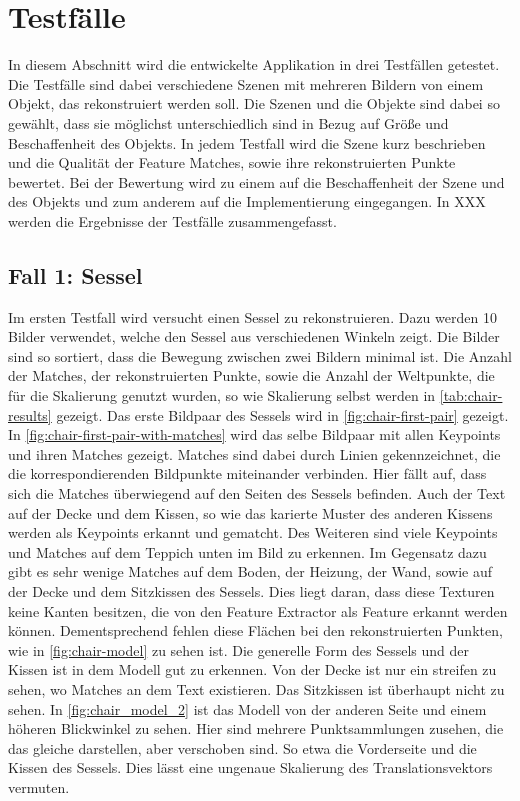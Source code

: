 
\chapter{Testfälle}

In diesem Abschnitt wird die entwickelte Applikation in drei Testfällen getestet.
Die Testfälle sind dabei verschiedene Szenen mit mehreren Bildern von einem Objekt, das rekonstruiert werden soll.
Die Szenen und die Objekte sind dabei so gewählt, dass sie möglichst unterschiedlich sind in Bezug auf Größe und Beschaffenheit des Objekts.
In jedem Testfall wird die Szene kurz beschrieben und die Qualität der Feature Matches, sowie ihre rekonstruierten Punkte bewertet.
Bei der Bewertung wird zu einem auf die Beschaffenheit der Szene und des Objekts und zum anderem auf die Implementierung eingegangen.
In XXX werden die Ergebnisse der Testfälle zusammengefasst.

\section{Fall 1: Sessel}
Im ersten Testfall wird versucht einen Sessel zu rekonstruieren.
Dazu werden 10 Bilder verwendet, welche den Sessel aus verschiedenen Winkeln zeigt.
Die Bilder sind so sortiert, dass die Bewegung zwischen zwei Bildern minimal ist.
Die Anzahl der Matches, der rekonstruierten Punkte, sowie die Anzahl der Weltpunkte, die für die Skalierung genutzt wurden, so wie Skalierung selbst werden in \cref{tab:chair-results} gezeigt. %
Das erste Bildpaar des Sessels wird in \cref{fig:chair-first-pair} gezeigt.
In \cref{fig:chair-first-pair-with-matches} wird das selbe Bildpaar mit allen Keypoints und ihren Matches gezeigt.
Matches sind dabei durch Linien gekennzeichnet, die die korrespondierenden Bildpunkte miteinander verbinden.
Hier fällt auf, dass sich die Matches überwiegend auf den Seiten des Sessels befinden.
Auch der Text auf der Decke und dem Kissen, so wie das karierte Muster des anderen Kissens werden als Keypoints erkannt und gematcht. %
Des Weiteren sind viele Keypoints und Matches auf dem Teppich unten im Bild zu erkennen.
Im Gegensatz dazu gibt es sehr wenige Matches auf dem Boden, der Heizung, der Wand, sowie auf der Decke und dem Sitzkissen des Sessels.
Dies liegt daran, dass diese Texturen keine Kanten besitzen, die von den Feature Extractor als Feature erkannt werden können.
Dementsprechend fehlen diese Flächen bei den rekonstruierten Punkten, wie in \cref{fig:chair-model} zu sehen ist.  
Die generelle Form des Sessels und der Kissen ist in dem Modell gut zu erkennen.
Von der Decke ist nur ein streifen zu sehen, wo Matches an dem Text existieren.  
Das Sitzkissen ist überhaupt nicht zu sehen.
In \cref{fig:chair_model_2} ist das Modell von der anderen Seite und einem höheren Blickwinkel zu sehen.
Hier sind mehrere Punktsammlungen zusehen, die das gleiche darstellen, aber verschoben sind.
So etwa die Vorderseite und die Kissen des Sessels.
Dies lässt eine ungenaue Skalierung des Translationsvektors vermuten.

